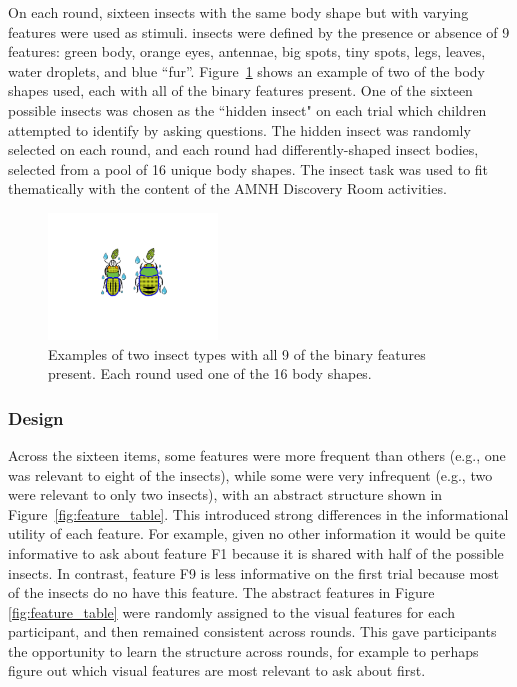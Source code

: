 \documentclass[man,floatsintext]{apa6}
\begin{document}
On each round, sixteen insects with the same body shape but with varying features were used as stimuli. insects were defined by the presence or absence of 9 features: green body, 
orange eyes, antennae, big spots, tiny spots, legs, leaves, water droplets, and blue 
``fur''. Figure~\ref{fig:example_bugs} shows an example of two of the body shapes used, each with all of the binary features present. One of the sixteen possible insects was chosen as the ``hidden insect" on each trial which 
children attempted to identify by asking questions. The hidden insect was 
randomly selected on each round, and each round had differently-shaped insect 
bodies, selected from a pool of 16 unique body shapes.  The insect task was used to fit thematically with the content of the AMNH Discovery Room activities.


\begin{figure}[h]
  \centering
  \includegraphics[width=0.4\textwidth]{figures/example_bugs}
  \caption{Examples of two insect types with all 9 of the binary features present. Each round used one of the 16 
body shapes. } %
  \label{fig:example_bugs}
\end{figure} 

\subsubsection{Design}

Across the sixteen items, some features were more frequent than others (e.g., one was relevant to eight of the  insects), while some were very infrequent (e.g., two were relevant to only two insects), with an
abstract structure shown in Figure~\ref{fig:feature_table}. This introduced
strong differences in the informational utility of each feature.  For example,
given no other information it would be quite informative to ask about feature F1
because it is shared with half of the possible insects.  In contrast, feature
F9 is less informative on the first trial because most of the insects do no have this
feature. The abstract features in Figure~
\ref{fig:feature_table} were randomly assigned to the visual features for each 
participant, and then remained consistent across rounds. This gave participants the 
opportunity to learn the structure across rounds, for example to perhaps figure out 
which visual features are most relevant to ask about first.
\end{document}
